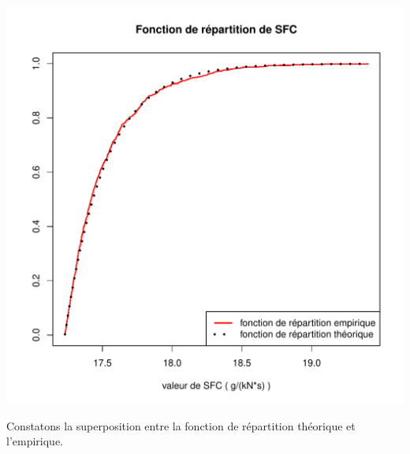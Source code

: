 \documentclass{book}
\begin{document}
\begin{center}
\end{center}\begin{center}
\includegraphics[scale=0.7]{SFC_fctrep.pdf}
\end{center}
Constatons la superposition entre la fonction de répartition théorique et l'empirique.
\end{document}
